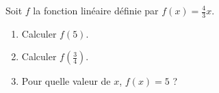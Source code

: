 
Soit $f$ la fonction linéaire définie par $f(x)=\frac{4}{3}x$.
\begin{enumerate}
\item Calculer $f(5)$.
\item Calculer $f\left( \frac{3}{4}\right)$.
\item Pour quelle valeur de $x$, $f(x)=5$ ?
\end{enumerate}

